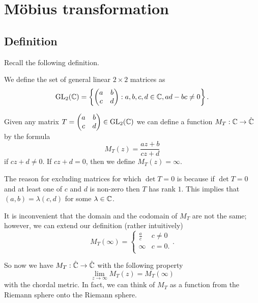 \chapter{M\"obius transformation}
\section{Definition}

Recall the following definition.

\begin{definition}
    We define the set of general linear $2 \times 2$ matrices as
    \[ \operatorname{GL}_2(\mathbb{C}) = \left\{ \begin{pmatrix} a & b \\ c & d \end{pmatrix} : a,b,c,d \in \mathbb{C}, ad-bc\neq 0\right\}. \]
\end{definition}

\begin{definition}
    Given any matrix $T = \begin{pmatrix} a & b \\ c & d \end{pmatrix} \in \operatorname{GL}_2(\mathbb{C})$ we can define a function $M_T: \mathbb{C} \to \hat {\mathbb{C}}$ by the formula
    \[ M_T(z) = \frac{az + b}{cz + d} \]
    if $cz + d \neq 0$. If $cz + d = 0$, then we define $M_T(z) = \infty$.
\end{definition}

\begin{remark}
    The reason for excluding matrices for which $\det{T} = 0$ is because if $\det{T} = 0$ and at least one of $c$ and $d$ is non-zero then $T$ has rank $1$. This implies that $(a, b) = \lambda(c, d)$ for some $\lambda \in \mathbb{C}$. 
\end{remark}

It is inconvenient that the domain and the codomain of $M_T$ are not the same; however, we can extend our definition (rather intuitively)
\[ 
    M_T(\infty) =
    \begin{cases}
        \frac ac & c \neq 0 \\
        \infty   & c = 0.   \\
    \end{cases}
    .
\]

So now we have $M_T: \hat {\mathbb{C}} \to \hat {\mathbb{C}}$ with the following property
\[ \lim_{z \to \infty} M_T(z) = M_T(\infty) \]
with the chordal metric. In fact, we can think of $M_T$ as a function from the Riemann sphere onto the Riemann sphere.

